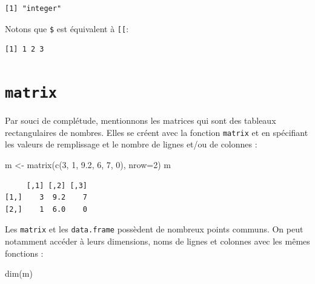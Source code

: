 \documentclass[
  letterpaper,
  DIV=11,
  numbers=noendperiod]{scrreprt}
\newenvironment{Shaded}{\begin{snugshade}}{\end{snugshade}}
\newcommand{\AttributeTok}[1]{\textcolor[rgb]{0.40,0.45,0.13}{#1}}
\newcommand{\DecValTok}[1]{\textcolor[rgb]{0.68,0.00,0.00}{#1}}
\newcommand{\FloatTok}[1]{\textcolor[rgb]{0.68,0.00,0.00}{#1}}
\newcommand{\FunctionTok}[1]{\textcolor[rgb]{0.28,0.35,0.67}{#1}}
\newcommand{\NormalTok}[1]{\textcolor[rgb]{0.00,0.23,0.31}{#1}}
\newcommand{\OtherTok}[1]{\textcolor[rgb]{0.00,0.23,0.31}{#1}}
\newcommand{\SpecialCharTok}[1]{\textcolor[rgb]{0.37,0.37,0.37}{#1}}
\begin{document}
\begin{verbatim}
[1] "integer"
\end{verbatim}

Notons que \texttt{\$} est équivalent à \texttt{{[}{[}}:

\begin{Shaded}
\end{Shaded}

\begin{verbatim}
[1] 1 2 3
\end{verbatim}

\hypertarget{matrix}{%
\section{\texorpdfstring{\texttt{matrix}}{matrix}}\label{matrix}}

Par souci de complétude, mentionnons les matrices qui sont des tableaux
rectangulaires de nombres. Elles se créent avec la fonction
\texttt{matrix} et en spécifiant les valeurs de remplissage et le nombre
de lignes et/ou de colonnes :

\begin{Shaded}
\begin{Highlighting}[]
\NormalTok{m }\OtherTok{\textless{}{-}} \FunctionTok{matrix}\NormalTok{(}\FunctionTok{c}\NormalTok{(}\DecValTok{3}\NormalTok{, }\DecValTok{1}\NormalTok{, }\FloatTok{9.2}\NormalTok{, }\DecValTok{6}\NormalTok{, }\DecValTok{7}\NormalTok{, }\DecValTok{0}\NormalTok{), }\AttributeTok{nrow=}\DecValTok{2}\NormalTok{)}
\NormalTok{m}
\end{Highlighting}
\end{Shaded}

\begin{verbatim}
     [,1] [,2] [,3]
[1,]    3  9.2    7
[2,]    1  6.0    0
\end{verbatim}

Les \texttt{matrix} et les \texttt{data.frame} possèdent de nombreux
points communs. On peut notamment accéder à leurs dimensions, noms de
lignes et colonnes avec les mêmes fonctions :

\begin{Shaded}
\begin{Highlighting}[]
\FunctionTok{dim}\NormalTok{(m)}
\end{Highlighting}
\end{Shaded}
\end{document}

